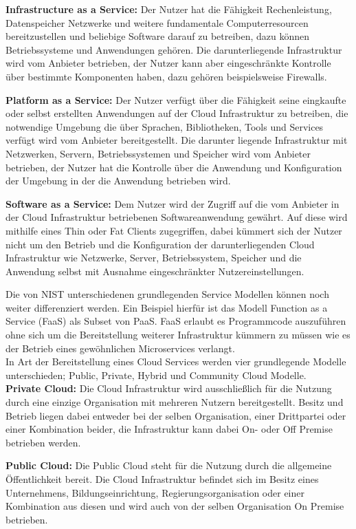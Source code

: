 \begin{spacing}{1.2}
\textbf{Infrastructure as a Service:} Der Nutzer hat die Fähigkeit Rechenleistung, Datenspeicher
Netzwerke und weitere fundamentale Computerresourcen bereitzustellen und beliebige Software
darauf zu betreiben, dazu können Betriebssysteme und Anwendungen gehören. Die
darunterliegende Infrastruktur wird vom Anbieter betrieben, der Nutzer  kann aber
eingeschränkte Kontrolle über bestimmte Komponenten haben, dazu gehören beispielsweise
Firewalls.

\textbf{Platform as a Service:} Der Nutzer verfügt über die Fähigkeit seine eingkaufte oder
selbst erstellten Anwendungen auf der Cloud Infrastruktur zu betreiben, die notwendige
Umgebung die über Sprachen, Bibliotheken, Tools und Services verfügt wird vom Anbieter
bereitgestellt. Die darunter liegende Infrastruktur mit Netzwerken, Servern,
Betriebssystemen und Speicher wird vom Anbieter betrieben, der Nutzer hat die Kontrolle
über die Anwendung und Konfiguration der Umgebung in der die Anwendung betrieben wird.

\textbf{Software as a Service:} Dem Nutzer wird der Zugriff auf die vom Anbieter in der
Cloud Infrastruktur betriebenen Softwareanwendung gewährt. Auf diese wird mithilfe
eines Thin oder Fat Clients zugegriffen, dabei kümmert sich der Nutzer nicht um den
Betrieb und die Konfiguration der darunterliegenden Cloud Infrastruktur wie
Netzwerke, Server, Betriebssystem, Speicher und die Anwendung selbst mit Ausnahme
eingeschränkter Nutzereinstellungen.

Die von NIST unterschiedenen grundlegenden Service Modellen können noch weiter
differenziert werden.
Ein Beispiel hierfür ist das Modell Function as a Service (FaaS) als Subset von PaaS.
FaaS erlaubt es Programmcode auszuführen ohne sich um die Bereitstellung weiterer 
Infrastruktur kümmern zu müssen wie es der Betrieb eines gewöhnlichen Microservices
verlangt.\\

In Art der Bereitstellung eines Cloud Services werden vier grundlegende Modelle
unterschieden; Public, Private, Hybrid und Community Cloud Modelle.\\

\textbf{Private Cloud:} Die Cloud Infrastruktur wird ausschließlich für die Nutzung durch eine einzige
Organisation mit mehreren Nutzern bereitgestellt. Besitz und Betrieb liegen dabei
entweder bei der selben Organisation, einer Drittpartei oder einer Kombination beider, 
die Infrastruktur kann dabei On- oder Off Premise betrieben werden.

\textbf{Public Cloud:} Die Public Cloud steht für die Nutzung durch die allgemeine Öffentlichkeit bereit.
Die Cloud Infrastruktur befindet sich im Besitz eines Unternehmens, Bildungseinrichtung,
Regierungsorganisation oder einer Kombination aus diesen und wird auch von der selben
Organisation On Premise betrieben. 


\end{spacing}
